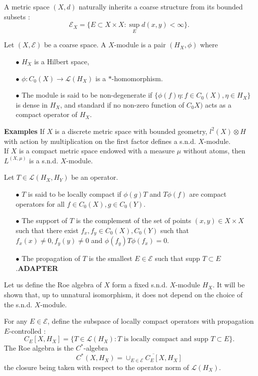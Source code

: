 A metric space $(X,d)$ naturally inherits a coarse structure from its bounded subsets :
\[\mathcal E_X = \{E\subset X\times X : \sup_{E} d(x,y)<\infty\}.\]

\begin{definition}
Let $(X,\mathcal E)$ be a coarse space. A $X$-module is a pair $(H_X,\phi )$ where 
\begin{itemize}
\item[$\bullet$] $H_X$ is a Hilbert space, 
\item[$\bullet$] $\phi : C_0(X)\rightarrow \mathcal L(H_X)$ is a $*$-homomorphism.
\item[$\bullet$] The module is said to be non-degenerate if $\{\phi(f)\eta : f\in C_0(X),\eta\in H_X\}$ is dense in $H_X$, and standard if no non-zero function of $C_0X)$ acts as a compact operator of $H_X$.
\end{itemize}
\end{definition}

\textbf{Examples} If $X$ is a discrete metric space with bounded geometry, $l^2(X)\otimes H$ with action by multiplication on the first factor defines a s.n.d. $X$-module.\\
If $X$ is a compact metric space endowed with a measure $\mu$ without atoms, then $L^(X,\mu)$ is a s.n.d. $X$-module.\\

\begin{definition}
Let $T\in \mathcal L(H_X, H_Y)$ be an operator.
\begin{itemize}
\item[$\bullet$] $T$ is said to be locally compact if $\phi(g)T$ and $T\phi(f)$ are compact operators for all $f\in C_0(X),g\in C_0(Y)$.
\item[$\bullet$] The support of $T$ is the complement of the set of points $(x,y)\in X\times X$ such that there exist $f_x,f_y\in C_0(X),C_0(Y)$ such that $f_x(x)\neq 0,f_{y}(y)\neq 0$ and $\phi(f_{y}) T \phi(f_x)=0$.
\item[$\bullet$] The propagation of $T$ is the smallest $E\in \mathcal E$ such that supp $T \subset E$.\textbf{ADAPTER}
\end{itemize}
\end{definition}

Let us define the Roe algebra of $X$ form a fixed s.n.d. $X$-module $H_X$. It will be shown that, up to unnatural isomorphism, it does not depend on the choice of the s.n.d. $X$-module.\\

\begin{definition}
For any $E\in \mathcal E$, define the subspace of locally compact operators with propagation $E$-controlled :
\[C_E[X,H_X] = \{T\in\mathcal L(H_X) : T \text{ is locally compact and supp }T\subset E\}.\]
The Roe algebra is the $C^*$-algebra 
\[C^*(X,H_X) = \overline{\cup_{E\in\mathcal E} C_E[X,H_X]}\]
the closure being taken with respect to the operator norm of $\mathcal L(H_X)$.
\end{definition}

